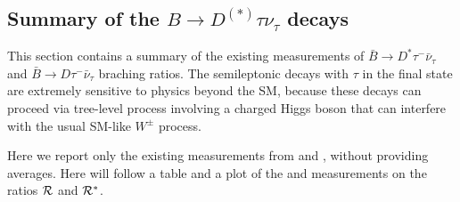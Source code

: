 \subsection{Summary of the $B\to D^{(*)}\tau \nu_\tau$ decays}
\label{slbdecays_b2dtaunu}
This section contains a summary of the existing measurements
of $\bar B\to D^*\tau^-\bar\nu_\tau$ and $\bar B\to D\tau^-\bar\nu_\tau$
braching ratios. 
The semileptonic decays with $\tau$ in the final state 
are extremely sensitive to physics beyond the SM, because these decays
can proceed via tree-level process involving a charged Higgs boson
that can interfere with the usual SM-like $W^{\pm}$ process.

Here we report only the existing measurements from \babar and \belle,
without providing averages. 
Here will follow a table and a plot of the \babar and \belle measurements
on the ratios $\cal R$ and $\cal R^*$.
